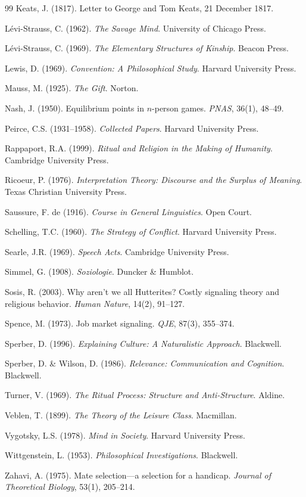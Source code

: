 \documentclass[11pt,twoside]{book}
\theoremstyle{plain}
\theoremstyle{definition}
\theoremstyle{remark}
\begin{document}
\begin{thebibliography}{99}
 Keats, J. (1817). Letter to George and Tom Keats, 21 December 1817.

 L\'evi-Strauss, C. (1962). \textit{The Savage Mind}. University of Chicago Press.

 L\'evi-Strauss, C. (1969). \textit{The Elementary Structures of Kinship}. Beacon Press.

 Lewis, D. (1969). \textit{Convention: A Philosophical Study}. Harvard University Press.

 Mauss, M. (1925). \textit{The Gift}. Norton.

 Nash, J. (1950). Equilibrium points in $n$-person games. \textit{PNAS}, 36(1), 48--49.

 Peirce, C.S. (1931--1958). \textit{Collected Papers}. Harvard University Press.

 Rappaport, R.A. (1999). \textit{Ritual and Religion in the Making of Humanity}. Cambridge University Press.

 Ricoeur, P. (1976). \textit{Interpretation Theory: Discourse and the Surplus of Meaning}. Texas Christian University Press.

 Saussure, F. de (1916). \textit{Course in General Linguistics}. Open Court.

 Schelling, T.C. (1960). \textit{The Strategy of Conflict}. Harvard University Press.

 Searle, J.R. (1969). \textit{Speech Acts}. Cambridge University Press.

 Simmel, G. (1908). \textit{Soziologie}. Duncker \& Humblot.

 Sosis, R. (2003). Why aren't we all Hutterites? Costly signaling theory and religious behavior. \textit{Human Nature}, 14(2), 91--127.

 Spence, M. (1973). Job market signaling. \textit{QJE}, 87(3), 355--374.

 Sperber, D. (1996). \textit{Explaining Culture: A Naturalistic Approach}. Blackwell.

 Sperber, D. \& Wilson, D. (1986). \textit{Relevance: Communication and Cognition}. Blackwell.

 Turner, V. (1969). \textit{The Ritual Process: Structure and Anti-Structure}. Aldine.

 Veblen, T. (1899). \textit{The Theory of the Leisure Class}. Macmillan.

 Vygotsky, L.S. (1978). \textit{Mind in Society}. Harvard University Press.

 Wittgenstein, L. (1953). \textit{Philosophical Investigations}. Blackwell.

 Zahavi, A. (1975). Mate selection---a selection for a handicap. \textit{Journal of Theoretical Biology}, 53(1), 205--214.

\end{thebibliography}
\end{document}
